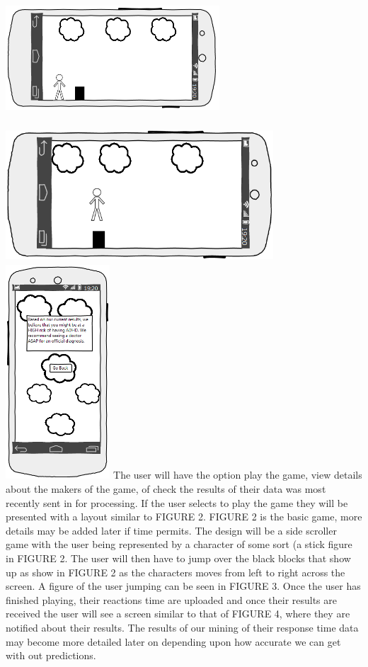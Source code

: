\documentclass[a4wide]{article}
\begin{document}
\includegraphics[width =8cm,height=5cm]{images/screen_layout.png}
\includegraphics[width =10cm,height=5cm]{images/user_jumping.png}
\includegraphics[height=8cm]{images/diagnosis_screen.png} The user will have the option play the game, view details about the makers of the game, of check the results of their data was most recently sent in for processing. If the user selects to play the game they will be presented with a layout similar to FIGURE 2. FIGURE 2 is the basic game, more details may be added later if time permits. The design will be a side scroller game with the user being represented by a character of some sort (a stick figure in FIGURE 2. The user will then have to jump over the black blocks that show up as show in FIGURE 2 as the characters moves from left to right across the screen.  A figure of the user jumping can be seen in FIGURE 3. Once the user has finished playing, their reactions time are uploaded and once their results are received the user will see a screen similar to that of FIGURE 4, where they are notified about their results. The results of our mining of their response time data may become more detailed later on depending upon how accurate we can get with out predictions.
\end{document}
